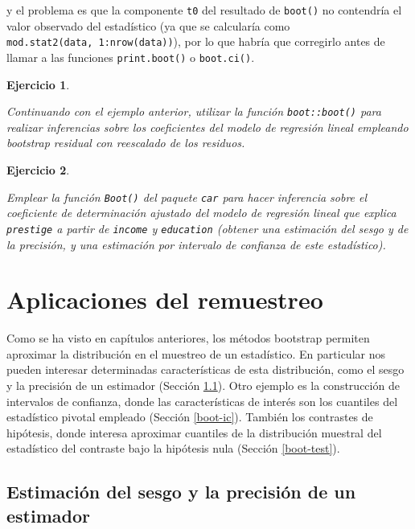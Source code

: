\documentclass[
  spanish,
  10pt,
]{book}
\theoremstyle{break}
\newtheorem{exercise}{Ejercicio}[chapter]
\theoremstyle{nonumberplain}
\begin{document}
y el problema es que la componente \texttt{t0} del resultado de \texttt{boot()} no contendría el valor observado del estadístico (ya que se calcularía como \texttt{mod.stat2(data,\ 1:nrow(data))}), por lo que habría que corregirlo antes de llamar a las funciones \texttt{print.boot()} o \texttt{boot.ci()}.

\begin{exercise}
\protect\hypertarget{exr:boot-coef}{}\label{exr:boot-coef}

Continuando con el ejemplo anterior, utilizar la función \texttt{boot::boot()} para realizar inferencias sobre los coeficientes del modelo de regresión lineal empleando bootstrap residual con reescalado de los residuos.
\end{exercise}

\begin{exercise}
\protect\hypertarget{exr:boot-car}{}\label{exr:boot-car}

Emplear la función \texttt{Boot()} del paquete \texttt{car} para hacer inferencia sobre
el coeficiente de determinación ajustado del modelo de regresión lineal
que explica \texttt{prestige} a partir de \texttt{income} y \texttt{education}
(obtener una estimación del sesgo y de la precisión,
y una estimación por intervalo de confianza de este estadístico).
\end{exercise}

\chapter{Aplicaciones del remuestreo}\label{boot-aplic}

Como se ha visto en capítulos anteriores, los métodos bootstrap permiten aproximar la distribución en el muestreo de un estadístico.
En particular nos pueden interesar determinadas características de esta distribución, como el sesgo y la precisión de un estimador (Sección \ref{sesgo-prec}).
Otro ejemplo es la construcción de intervalos de confianza, donde las características de interés son los cuantiles del estadístico pivotal empleado (Sección \ref{boot-ic}).
También los contrastes de hipótesis, donde interesa aproximar cuantiles de la distribución muestral del estadístico del contraste bajo la hipótesis nula (Sección \ref{boot-test}).

\section{Estimación del sesgo y la precisión de un estimador}\label{sesgo-prec}
\end{document}
